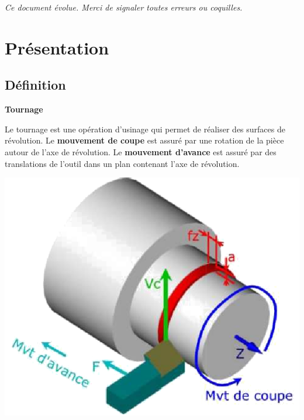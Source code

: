 \documentclass[11pt,oneside]{article}
\begin{document}
\tableofcontents

 \renewcommand{\baselinestretch}{1.2}
\setlength{\parskip}{2ex plus 0.5ex minus 0.2ex}

\textit{Ce document évolue. Merci de signaler toutes erreurs ou coquilles.}

\section{Présentation}

\subsection{Définition}

\begin{defi}
\textbf{Tournage}

\begin{minipage}[c]{.55\linewidth}
Le tournage est une opération d'usinage qui permet de réaliser des surfaces de révolution. Le \textbf{mouvement de coupe} est assuré par une rotation de la pièce autour de l'axe de révolution. Le \textbf{mouvement d'avance} est assuré par des translations de l'outil dans un plan contenant l'axe de révolution. 
\end{minipage}\hfill
\begin{minipage}[c]{.4\linewidth}
\begin{center}
\includegraphics[width=.95\textwidth]{png/mvt_tournage}
\end{center}
\end{minipage}
\end{defi}
\end{document}
